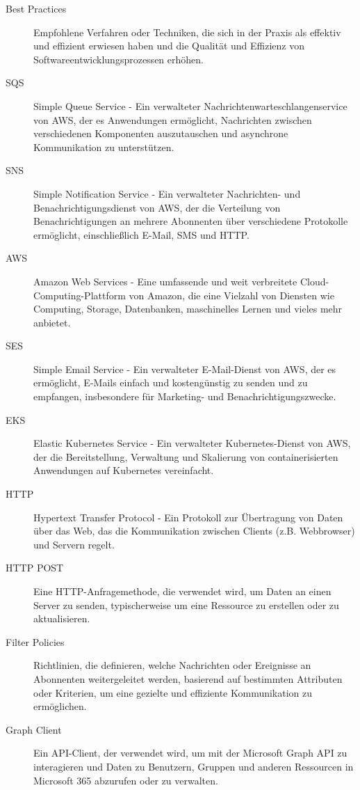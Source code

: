 \begin{description}
    \item[\hypertarget{BestPractices}{Best Practices}] Empfohlene Verfahren oder Techniken, die sich in der Praxis als effektiv und effizient erwiesen haben und die Qualität und Effizienz von Softwareentwicklungsprozessen erhöhen.
    \item[\hypertarget{SQS}{SQS}] Simple Queue Service - Ein verwalteter Nachrichtenwarteschlangenservice von AWS, der es Anwendungen ermöglicht, Nachrichten zwischen verschiedenen Komponenten auszutauschen und asynchrone Kommunikation zu unterstützen.
    \item[\hypertarget{SNS}{SNS}] Simple Notification Service - Ein verwalteter Nachrichten- und Benachrichtigungsdienst von AWS, der die Verteilung von Benachrichtigungen an mehrere Abonnenten über verschiedene Protokolle ermöglicht, einschließlich E-Mail, SMS und HTTP.
    \item[\hypertarget{AWS}{AWS}] Amazon Web Services - Eine umfassende und weit verbreitete Cloud-Computing-Plattform von Amazon, die eine Vielzahl von Diensten wie Computing, Storage, Datenbanken, maschinelles Lernen und vieles mehr anbietet.
    \item[\hypertarget{SES}{SES}] Simple Email Service - Ein verwalteter E-Mail-Dienst von AWS, der es ermöglicht, E-Mails einfach und kostengünstig zu senden und zu empfangen, insbesondere für Marketing- und Benachrichtigungszwecke.
    \item[\hypertarget{EKS}{EKS}] Elastic Kubernetes Service - Ein verwalteter Kubernetes-Dienst von AWS, der die Bereitstellung, Verwaltung und Skalierung von containerisierten Anwendungen auf Kubernetes vereinfacht.
    \item[\hypertarget{HTTP}{HTTP}] Hypertext Transfer Protocol - Ein Protokoll zur Übertragung von Daten über das Web, das die Kommunikation zwischen Clients (z.B. Webbrowser) und Servern regelt.
    \item[\hypertarget{HTTPPOST}{HTTP POST}] Eine HTTP-Anfragemethode, die verwendet wird, um Daten an einen Server zu senden, typischerweise um eine Ressource zu erstellen oder zu aktualisieren.
    \item[\hypertarget{FilterPolicies}{Filter Policies}] Richtlinien, die definieren, welche Nachrichten oder Ereignisse an Abonnenten weitergeleitet werden, basierend auf bestimmten Attributen oder Kriterien, um eine gezielte und effiziente Kommunikation zu ermöglichen.
    \item[\hypertarget{GraphClient}{Graph Client}] Ein API-Client, der verwendet wird, um mit der Microsoft Graph API zu interagieren und Daten zu Benutzern, Gruppen und anderen Ressourcen in Microsoft 365 abzurufen oder zu verwalten.

\end{description}

